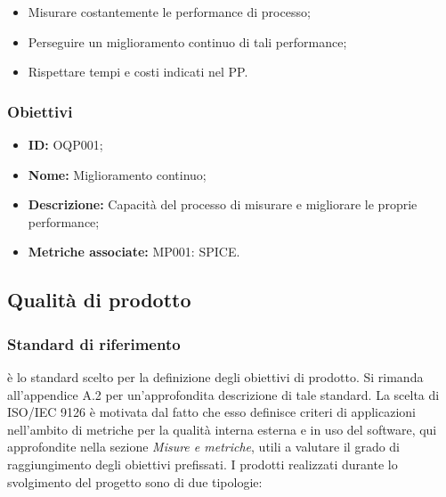 \documentclass[openany,12pt,a4paper]{report}
\begin{document}
    \begin{itemize}
        \item Misurare costantemente le performance di processo;
        \item Perseguire un miglioramento continuo di tali performance;
        \item Rispettare tempi e costi indicati nel PP.
    \end{itemize} 
    
    \subsubsection{Obiettivi}

        \begin{itemize}
            \item \textbf{ID:} OQP001;
            \item \textbf{Nome:} Miglioramento continuo;
            \item \textbf{Descrizione:} Capacità del processo di misurare e migliorare le proprie performance;
            \item \textbf{Metriche associate:} MP001: SPICE.
        \end{itemize}
    
    \subsection{Qualità di prodotto}
    
    \subsubsection{Standard di riferimento}
    
     è lo standard scelto per la definizione degli obiettivi di prodotto. Si rimanda all'appendice A.2 per un'approfondita descrizione di tale standard.
    La scelta di ISO/IEC 9126 è motivata dal fatto che esso definisce criteri di applicazioni nell'ambito di metriche per la qualità interna esterna e in uso del software, qui approfondite nella sezione \textit{Misure e metriche}, utili a valutare il grado di raggiungimento degli obiettivi prefissati.
    I prodotti realizzati durante lo svolgimento del progetto sono di due tipologie:
    
\end{document}

